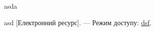 \begin{thebibliography}
    asda

    asd [Електронний ресурс]. --- Режим доступу: \url{dsf}.

\end{thebibliography}
